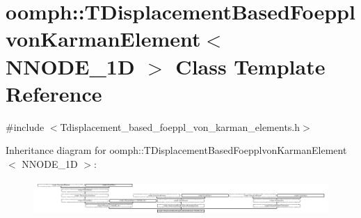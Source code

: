 \hypertarget{classoomph_1_1TDisplacementBasedFoepplvonKarmanElement}{}\section{oomph\+:\+:T\+Displacement\+Based\+Foepplvon\+Karman\+Element$<$ N\+N\+O\+D\+E\+\_\+1D $>$ Class Template Reference}
\label{classoomph_1_1TDisplacementBasedFoepplvonKarmanElement}


{\ttfamily \#include $<$Tdisplacement\+\_\+based\+\_\+foeppl\+\_\+von\+\_\+karman\+\_\+elements.\+h$>$}

Inheritance diagram for oomph\+:\+:T\+Displacement\+Based\+Foepplvon\+Karman\+Element$<$ N\+N\+O\+D\+E\+\_\+1D $>$\+:\begin{figure}[H]
\begin{center}
\leavevmode
\includegraphics[height=1.336516cm]{classoomph_1_1TDisplacementBasedFoepplvonKarmanElement}
\end{center}
\end{figure}
